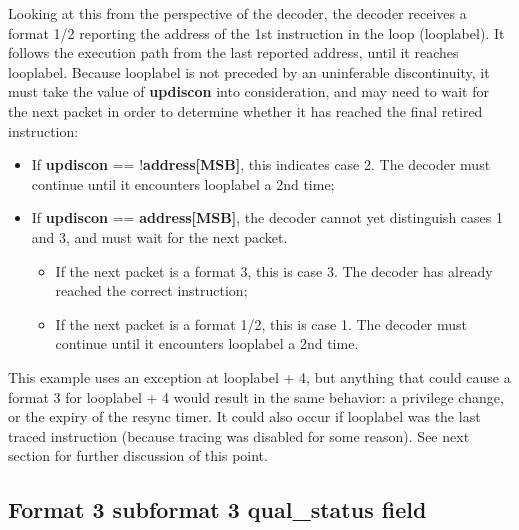 Looking at this from the perspective of the decoder, the decoder receives a format 1/2 reporting the address of the 1st instruction in the 
loop (looplabel).  It follows the execution path from the last reported address, until it reaches looplabel.  Because looplabel is not 
preceded by an uninferable discontinuity, it must take the value of \textbf{updiscon} into consideration, and may need to wait for the 
next packet in order to determine whether it has reached the final retired instruction:
\begin{itemize}  
  \item If \textbf{updiscon} == !\textbf{address[MSB]}, this indicates case 2.  The decoder must continue until it encounters 
    looplabel a 2nd time;
  \item If \textbf{updiscon} == \textbf{address[MSB]}, the decoder cannot yet distinguish cases 1 and 3, and must wait for the 
    next packet.
    \begin{itemize}
      \item If the next packet is a format 3, this is case 3.  The decoder has already reached the correct instruction;
      \item If the next packet is a format 1/2, this is case 1.  The decoder must continue until it encounters 
        looplabel a 2nd time.
    \end{itemize}
\end{itemize}

This example uses an exception at looplabel + 4, but anything that could cause a format 3 for looplabel + 4 would result in 
the same behavior: a privilege change, or the expiry of the resync timer.  It could also occur if looplabel was the last
traced instruction (because tracing was disabled for some reason).  See next section for further discussion of this point.

\subsection{Format 3 subformat 3 \textbf{qual\_status} field}


